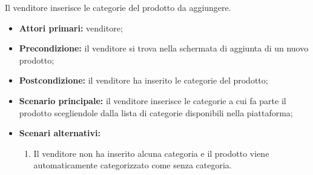 Il venditore inserisce le categorie del prodotto da aggiungere.
\begin{itemize}
    \item \textbf{Attori primari:} venditore;
    \item \textbf{Precondizione:} il venditore si trova nella schermata di aggiunta di un nuovo prodotto;
    \item \textbf{Postcondizione:} il venditore ha inserito le categorie del prodotto;
    \item \textbf{Scenario principale:} il venditore inserisce le categorie a cui fa parte il prodotto scegliendole dalla lista di categorie disponibili nella piattaforma;
    \item \textbf{Scenari alternativi:}
    \begin{enumerate}[label=\lett]
    	\item Il venditore non ha inserito alcuna categoria e il prodotto viene automaticamente categorizzato come senza categoria.
    \end{enumerate}
\end{itemize}

\label{aggiunta-prodotto.prezzo}

